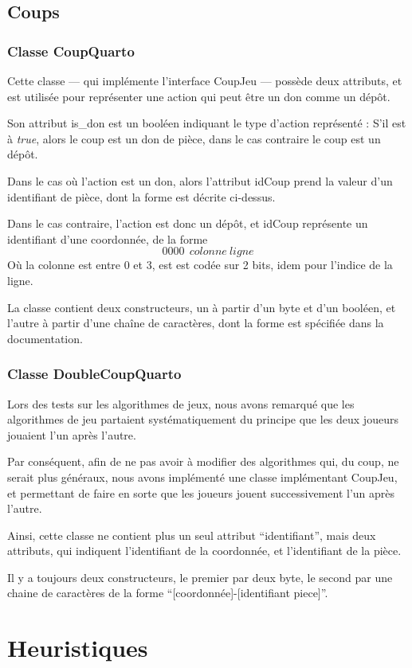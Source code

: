 \documentclass{article}
\begin{document}
\subsection{Coups}
\subsubsection{Classe CoupQuarto}
Cette classe --- qui implémente l'interface CoupJeu ---
possède deux attributs, et est utilisée pour représenter
une action qui peut être un don comme un dépôt.

Son attribut is\_don est un booléen indiquant le type d'action
représenté : S'il est à \emph{true}, alors le coup est un don de
pièce, dans le cas contraire le coup est un dépôt.

Dans le cas o\`u l'action est un don, alors l'attribut idCoup prend la 
valeur d'un identifiant de pièce, dont la forme est décrite
ci-dessus. 

Dans le cas contraire, l'action est donc un dépôt, et idCoup
représente un identifiant d'une coordonnée, de la forme
\[ 0000~~colonne~ligne\]
O\`u la colonne est entre 0 et 3, est est codée sur 2 bits, idem pour
l'indice de la ligne.

La classe contient deux constructeurs, un à partir d'un byte et d'un
booléen, et l'autre à partir d'une chaîne de caractères, dont la forme
est spécifiée dans la documentation. %


\subsubsection{Classe DoubleCoupQuarto}
Lors des tests sur les algorithmes de jeux, nous avons remarqué que
les algorithmes de jeu partaient systématiquement du principe que les
deux joueurs jouaient l'un après l'autre.

Par conséquent, afin de ne pas avoir à modifier des algorithmes qui,
du coup, ne serait plus généraux, nous avons implémenté une classe
implémentant CoupJeu, et permettant de faire en sorte que les joueurs
jouent successivement l'un après l'autre.

Ainsi, cette classe ne contient plus un seul attribut ``identifiant'',
mais deux attributs, qui indiquent l'identifiant de la coordonnée,
et l'identifiant de la pièce.

Il y a toujours deux constructeurs, le premier par deux byte, le
second par une chaine de caractères de la forme
``[coordonnée]-[identifiant piece]''.


\section{Heuristiques}
\end{document}
